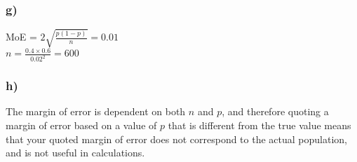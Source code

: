 \documentclass[]{article}
\begin{document}
\subsubsection{g)}
MoE = $2\sqrt{\frac{p(1-p)}{n}} = 0.01$
\\
$n = \frac{0.4\times0.6}{0.02^2} = 600$
\subsubsection{h)}
The margin of error is dependent on both $n$ and $p$, and therefore quoting a margin of error based on a value of $p$ that is different from the true value means that your quoted margin of error does not correspond to the actual population, and is not useful in calculations.
\end{document}
